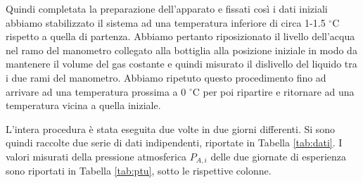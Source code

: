 Quindi completata la preparazione dell'apparato e fissati così i dati iniziali abbiamo stabilizzato il sistema ad una temperatura inferiore di circa 1-1.5 $^\circ$C rispetto a quella di partenza. Abbiamo pertanto riposizionato il livello dell'acqua nel ramo del manometro collegato alla bottiglia alla posizione iniziale in modo da mantenere il volume del gas costante e quindi misurato il dislivello del liquido tra i due rami del manometro.
Abbiamo ripetuto questo procedimento fino ad arrivare ad una temperatura prossima a 0 $^\circ$C per poi ripartire e ritornare ad una temperatura vicina a quella iniziale.

L'intera procedura è stata eseguita due volte in due giorni differenti. Si sono quindi raccolte due serie di dati indipendenti, riportate
in Tabella \ref{tab:dati}. I valori misurati della pressione atmosferica $P_{A,i}$ delle due giornate di esperienza sono
riportati in Tabella \ref{tab:ptu}, sotto le rispettive colonne.

